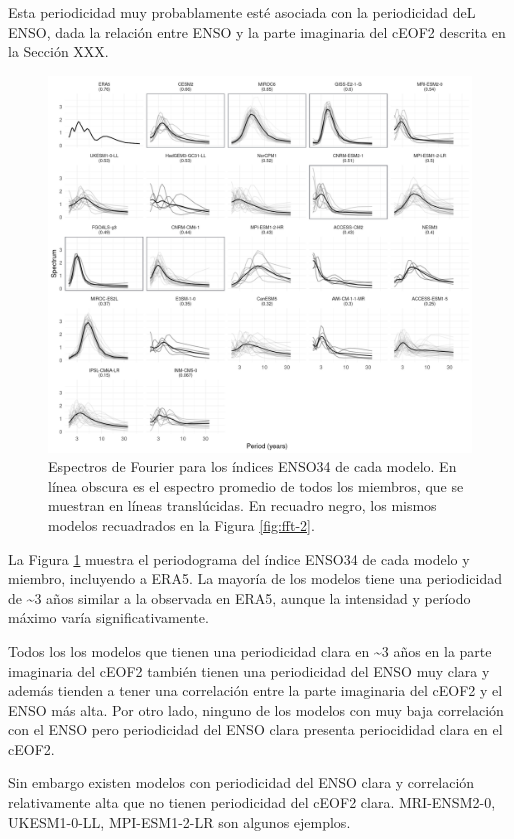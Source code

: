 \documentclass[12pt,oneside]{reedthesis}
\begin{document}
Esta periodicidad muy probablamente esté asociada con la periodicidad deL ENSO, dada la relación entre ENSO y la parte imaginaria del cEOF2 descrita en la Sección XXX.



\begin{figure}
\includegraphics{figures/50-cmip6/ensofft-1} \caption{Espectros de Fourier para los índices ENSO34 de cada modelo. En línea obscura es el espectro promedio de todos los miembros, que se muestran en líneas translúcidas. En recuadro negro, los mismos modelos recuadrados en la Figura \ref{fig:fft-2}.}\label{fig:ensofft}
\end{figure}

La Figura \ref{fig:ensofft} muestra el periodograma del índice ENSO34 de cada modelo y miembro, incluyendo a ERA5.
La mayoría de los modelos tiene una periodicidad de \textasciitilde3 años similar a la observada en ERA5, aunque la intensidad y período máximo varía significativamente.

Todos los los modelos que tienen una periodicidad clara en \textasciitilde3 años en la parte imaginaria del cEOF2 también tienen una periodicidad del ENSO muy clara y además tienden a tener una correlación entre la parte imaginaria del cEOF2 y el ENSO más alta.
Por otro lado, ninguno de los modelos con muy baja correlación con el ENSO pero periodicidad del ENSO clara presenta periocididad clara en el cEOF2.

Sin embargo existen modelos con periodicidad del ENSO clara y correlación relativamente alta que no tienen periodicidad del cEOF2 clara.
MRI-ENSM2-0, UKESM1-0-LL, MPI-ESM1-2-LR son algunos ejemplos.
\end{document}
